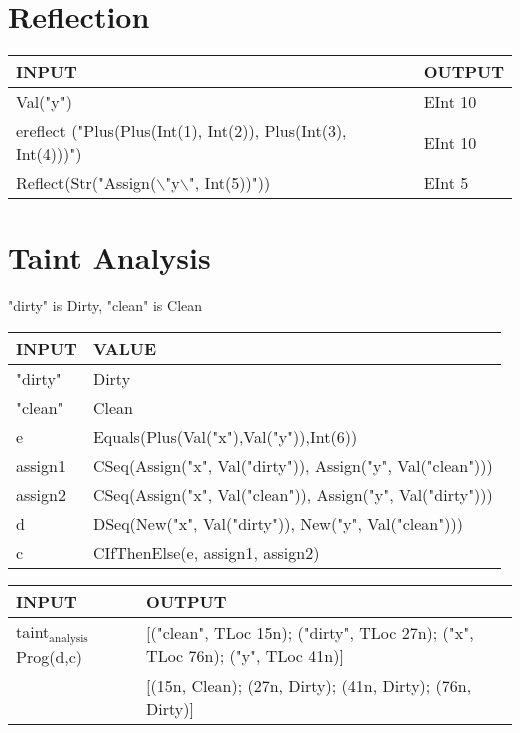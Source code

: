 \documentclass[11pt]{report}
\begin{document}
\chapter{Reflection}
\label{sec:org45d2f14}
\begin{center}
\begin{tabularx}{\textwidth}{Xl}
INPUT & OUTPUT\\
\hline
Val("y") & EInt 10\\
ereflect ("Plus(Plus(Int(1), Int(2)), Plus(Int(3), Int(4)))") & EInt 10\\
Reflect(Str("Assign($\backslash$"y$\backslash$", Int(5))")) & EInt 5\\
\end{tabularx}
\end{center}
\chapter{Taint Analysis}
\label{sec:org06638c7}
"dirty" is Dirty, "clean" is Clean
\begin{center}
\begin{tabularx}{\textwidth}{lX}
INPUT & VALUE\\
\hline
"dirty" & Dirty\\
"clean" & Clean\\
e & Equals(Plus(Val("x"),Val("y")),Int(6))\\
assign1 & CSeq(Assign("x", Val("dirty")), Assign("y", Val("clean")))\\
assign2 & CSeq(Assign("x", Val("clean")), Assign("y", Val("dirty")))\\
d & DSeq(New("x", Val("dirty")), New("y", Val("clean")))\\
c & CIfThenElse(e, assign1, assign2)\\
\end{tabularx}
\end{center}

\begin{center}
\begin{tabularx}{\textwidth}{lX}
INPUT & OUTPUT\\
\hline
taint\(_{\text{analysis}}\) Prog(d,c) & [("clean", TLoc 15n); ("dirty", TLoc 27n); ("x", TLoc 76n); ("y", TLoc 41n)]\\
 & [(15n, Clean); (27n, Dirty); (41n, Dirty); (76n, Dirty)]\\
\end{tabularx}
\end{center}
\end{document}
